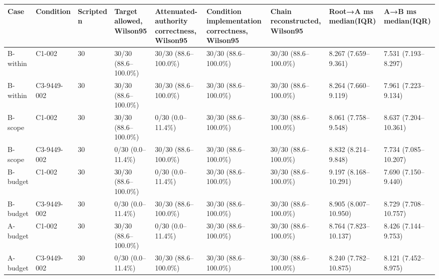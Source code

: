 \begin{tabular}{lllllllll}
\hline
Case & Condition & Scripted n & Target allowed, Wilson95 & Attenuated-authority correctness, Wilson95 & Condition implementation correctness, Wilson95 & Chain reconstructed, Wilson95 & Root→A ms median(IQR) & A→B ms median(IQR) \\
\hline
B-within & C1-002 & 30 & 30/30 (88.6--100.0\%) & 30/30 (88.6--100.0\%) & 30/30 (88.6--100.0\%) & 30/30 (88.6--100.0\%) & 8.267 (7.659--9.361) & 7.531 (7.193--8.297) \\
B-within & C3-9449-002 & 30 & 30/30 (88.6--100.0\%) & 30/30 (88.6--100.0\%) & 30/30 (88.6--100.0\%) & 30/30 (88.6--100.0\%) & 8.264 (7.660--9.119) & 7.961 (7.223--9.134) \\
B-scope & C1-002 & 30 & 30/30 (88.6--100.0\%) & 0/30 (0.0--11.4\%) & 30/30 (88.6--100.0\%) & 30/30 (88.6--100.0\%) & 8.061 (7.758--9.548) & 8.637 (7.204--10.361) \\
B-scope & C3-9449-002 & 30 & 0/30 (0.0--11.4\%) & 30/30 (88.6--100.0\%) & 30/30 (88.6--100.0\%) & 30/30 (88.6--100.0\%) & 8.832 (8.214--9.848) & 7.734 (7.085--10.207) \\
B-budget & C1-002 & 30 & 30/30 (88.6--100.0\%) & 0/30 (0.0--11.4\%) & 30/30 (88.6--100.0\%) & 30/30 (88.6--100.0\%) & 9.197 (8.168--10.291) & 7.690 (7.150--9.440) \\
B-budget & C3-9449-002 & 30 & 0/30 (0.0--11.4\%) & 30/30 (88.6--100.0\%) & 30/30 (88.6--100.0\%) & 30/30 (88.6--100.0\%) & 8.905 (8.007--10.950) & 8.729 (7.708--10.757) \\
A-budget & C1-002 & 30 & 30/30 (88.6--100.0\%) & 0/30 (0.0--11.4\%) & 30/30 (88.6--100.0\%) & 30/30 (88.6--100.0\%) & 8.764 (7.823--10.137) & 8.426 (7.144--9.753) \\
A-budget & C3-9449-002 & 30 & 0/30 (0.0--11.4\%) & 30/30 (88.6--100.0\%) & 30/30 (88.6--100.0\%) & 30/30 (88.6--100.0\%) & 8.240 (7.782--10.875) & 8.121 (7.452--8.975) \\
\hline
\end{tabular}
